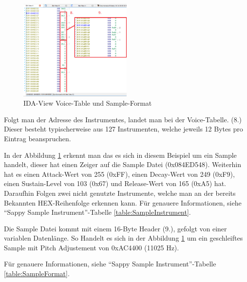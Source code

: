 \documentclass[11pt,a4paper]{scrartcl}
\begin{document}
\begin{figure}
	\vspace{-10pt}
	\begin{center}
		\includegraphics[width=0.5\textwidth]{Sampleformat}
	\end{center}
	\vspace{-10pt}
	\caption{IDA-View Voice-Table und Sample-Format}
	\label{fig:Sampleformat}
	\vspace{-30pt}
\end{figure}

Folgt man der Adresse des Instrumentes, landet man bei der Voice-Tabelle. (8.) Dieser besteht typischerweise aus 127 Instrumenten, welche jeweils 12 Bytes pro Eintrag beanspruchen.

In der Abbildung \ref{fig:Sampleformat} erkennt man das es sich in diesem Beispiel um ein Sample handelt, dieser hat einen Zeiger auf die Sample Datei (0x084ED548). Weiterhin hat es einen Attack-Wert von 255 (0xFF), einen Decay-Wert von 249 (0xF9), einen Sustain-Level von 103 (0x67) und Release-Wert von 165 (0xA5) hat. Daraufhin Folgen zwei nicht genutzte Instrumente, welche man an der bereits Bekannten HEX-Reihenfolge erkennen kann.
F\"{u}r genauere Informationen, siehe "`Sappy Sample Instrument"'-Tabelle \ref{table:SampleInstrument}.

Die Sample Datei kommt mit einem 16-Byte Header (9.), gefolgt von einer variablen Datenl\"{a}nge. So Handelt es sich in der Abbildung \ref{fig:Sampleformat} um ein geschleiftes Sample mit Pitch Adjustement
von 0xAC4400 (11025 Hz).

F\"{u}r genauere Informationen, siehe "`Sappy Sample Instrument"'-Tabelle \ref{table:SampleFormat}.
\end{document}
